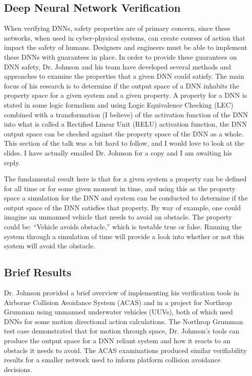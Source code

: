 \documentclass[10pt, journal]{IEEEtran}
\begin{document}
\subsection{Deep Neural Network Verification}
When verifying DNNs, safety properties are of primary concern, since these networks, when used in cyber-physical systems, can create courses of action that impact the safety of humans. Designers and engineers must be able to implement these DNNs with guarantees in place. In order to provide these guarantees on DNN safety, Dr. Johnson and his team have developed several methods and approaches to examine the properties that a given DNN could satisfy. The main focus of his research is to determine if the output space of a DNN inhabits the property space for a given system and a given property. A property for a DNN is stated in some logic formalism and using Logic Equivalence Checking (LEC) combined with a transformation (I believe) of the activation function of the DNN into what is called a Rectified Linear Unit (RELU) activation function, the DNN output space can be checked against the property space of the DNN as a whole. This section of the talk was a bit hard to follow, and I would love to look at the slides. I have actually emailed Dr. Johnson for a copy and I am awaiting his reply.

The fundamental result here is that for a given system a property can be defined for all time or for some given moment in time, and using this as the property space a simulation for the DNN and system can be conducted to determine if the output space of the DNN satisfies that property. By way of example, one could imagine an unmanned vehicle that needs to avoid an obstacle. The property could be: ``Vehicle avoids obstacle,'' which is testable true or false. Running the system through a simulation of time will provide a look into whether or not this system will avoid the obstacle.

\subsection{Brief Results}
Dr. Johnson provided a brief overview of implementing his verification tools in Airborne Collision Avoidance System (ACAS) and in a project for Northrop Grumman using unmanned underwater vehicles (UUVs), both of which used DNNs for some motion directional action calculations. The Northrop Grumman test case demonstrated that for motion through space, Dr. Johnson's tools can produce the output space for a DNN reliant system and how it reacts to an obstacle it needs to avoid. The ACAS examinations  produced similar verifiability results for a smaller network used to inform platform collision avoidance decisions.
\end{document}
